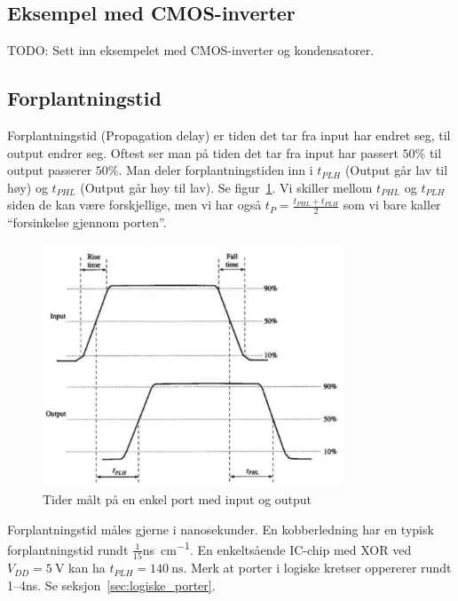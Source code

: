 \documentclass[12pt,a4paper,norsk]{article}
\begin{document}
\subsection{Eksempel med CMOS-inverter}
TODO\@: Sett inn eksempelet med CMOS-inverter og kondensatorer.

\subsection{Forplantningstid}
Forplantningstid (Propagation delay) er tiden det tar fra input har
endret seg, til output endrer seg. Oftest ser man på tiden det tar fra input har
passert $50\%$ til output passerer $50\%$. Man deler
forplantningstiden inn i $t_{PLH}$ (Output går lav til høy) og $t_{PHL}$ (Output
går høy til lav). Se figur~\ref{fig:delay}. Vi skiller mellom $t_{PHL}$ og
$t_{PLH}$ siden de kan være forskjellige, men vi har også
$t_{P} = \frac{t_{PHL}+t_{PLH}}{2}$ som vi bare kaller ``forsinkelse gjennom porten''.

\begin{figure}[hbt!]
  \centering
  \includegraphics[width=0.8\textwidth,height=0.8\textheight,keepaspectratio]{Krets_Delay}
  \caption{Tider målt på en enkel port med input og output\label{fig:delay}}
\end{figure}

Forplantningstid måles gjerne i nanosekunder. En kobberledning har en typisk
forplantningstid rundt $\frac{1}{15}$\si[per-mode =
fraction]{\nano\second\per\centi\meter}. En enkeltsående IC-chip med XOR ved
$V_{DD}=\SI{5}{\volt}$ kan ha $t_{PLH} = \SI{140}{\nano\second}$. Merk
at porter i logiske kretser oppererer rundt 1--4\si{\nano\second}. Se
seksjon~\ref{sec:logiske_porter}.
\end{document}
